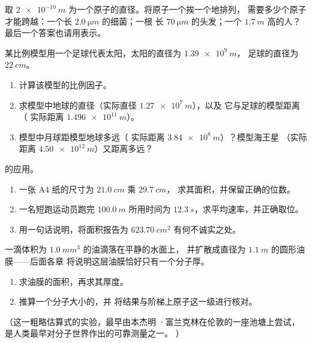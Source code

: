 \begin{exercise}[$\star\star$]\label{exo:g10:orders-of-magnitude:9}
取 $\qty{2e-10}{m}$ 为一个原子的直径。将原子一个挨一个地排列，
需要多少个原子才能跨越：一个长 $\qty{2.0}{\micro m}$ 的细菌；一根
长 $\qty{70}{\micro m}$ 的头发；一个 $\qty{1.7}{m}$ 高的人？
最后一个答案也请用表示。
\end{exercise}

\begin{exercise}[$\star\star$]\label{exo:g10:orders-of-magnitude:10}
某比例模型用一个足球代表太阳，太阳的直径为 $\qty{1.39e9}{m}$，
足球的直径为 $\qty{22}{cm}$。
\begin{enumerate}
  \item 计算该模型的比例因子。
  \item 求模型中地球的直径（实际直径 $\qty{1.27e7}{m}$），以及
        它与足球的模型距离（
        实际距离 $\qty{1.496e11}{m}$）。
  \item 模型中月球距模型地球多远（
        实际距离 $\qty{3.84e8}{m}$）？模型海王星
        （实际距离 $\qty{4.50e12}{m}$）又距离多远？
\end{enumerate}
\end{exercise}

\begin{exercise}[$\star\star$]\label{exo:g10:orders-of-magnitude:11}
的应用。
\begin{enumerate}
  \item 一张 A4 纸的尺寸为 $\qty{21.0}{cm}$ 乘 $\qty{29.7}{cm}$，
        求其面积，并保留正确的位数。
  \item 一名短跑运动员跑完 $\qty{100.0}{m}$ 所用时间为
        $\qty{12.3}{s}$，求平均速率，并正确取位。
  \item 用一句话说明，将面积报告为
        $\qty{623.70}{cm^2}$ 有何不诚实之处。
\end{enumerate}
\end{exercise}

\begin{exercise}[$\star\star\star$]\label{exo:g10:orders-of-magnitude:12}
一滴体积为 $\qty{1.0}{mm^3}$ 的油滴落在平静的水面上，
并扩散成直径为 $\qty{1.1}{m}$ 的圆形油膜——后面各章
将说明这层油膜恰好只有一个分子厚。
\begin{enumerate}
  \item 求油膜的面积，再求其厚度。
  \item 推算一个分子大小的，并
        将结果与阶梯上原子这一级进行核对。
\end{enumerate}
（这一粗略估算式的实验，最早由本杰明
·富兰克林在伦敦的一座池塘上尝试，是人类最早对分子世界作出的可靠测量之一。
）
\end{exercise}

